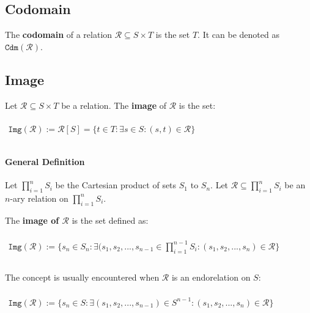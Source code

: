 \subsection{Codomain}
\label{sec:codomain}

The \textbf{codomain} of a relation $\mathcal{R} \subseteq S \times T$
is the set $T$. It can be denoted as $\mathtt{Cdm}(\mathcal{R})$.


\subsection{Image}
\label{sec:image}

Let $\mathcal{R} \subseteq S \times T$ be a relation. The
\textbf{image} of $\mathcal{R}$ is the set:

\begin{math}
  \begin{array}{c}
    \\
    \mathtt{Img}(\mathcal{R}) := \mathcal{R}[S] = \{ t \in T: \exists s \in S: (s, t) \in \mathcal{R} \}\\
    \\
  \end{array}
\end{math}

\paragraph{General Definition}

Let $\displaystyle \prod_{i=1}^n S_i$ be the Cartesian product of sets
$S_1$ to $S_n$. Let
$\mathcal{R} \subseteq \displaystyle \prod_{i=1}^n S_i$ be an $n$-ary
relation on $\displaystyle \prod_{i=1}^n S_i$.

The \textbf{image of $\mathcal{R}$} is the set defined as:

\begin{math}
  \begin{array}{c}
    \\
    \mathtt{Img}(\mathcal{R}) := \{ s_n \in S_n: \exists (s_1, s_2, ..., s_{n-1} \in \displaystyle \prod_{i=1}^{n-1} S_i: (s_1, s_2, ..., s_n) \in \mathcal{R} \}\\
    \\
  \end{array}
\end{math}

The concept is usually encountered when $\mathcal{R}$ is an
endorelation on $S$:

\begin{math}
  \begin{array}{c}
    \\
    \mathtt{Img}(\mathcal{R}) := \{ s_n \in S: \exists (s_1, s_2, ..., s_{n-1}) \in S^{n-1}: (s_1, s_2, ..., s_n) \in \mathcal{R} \}\\
    \\
  \end{array}
\end{math}


